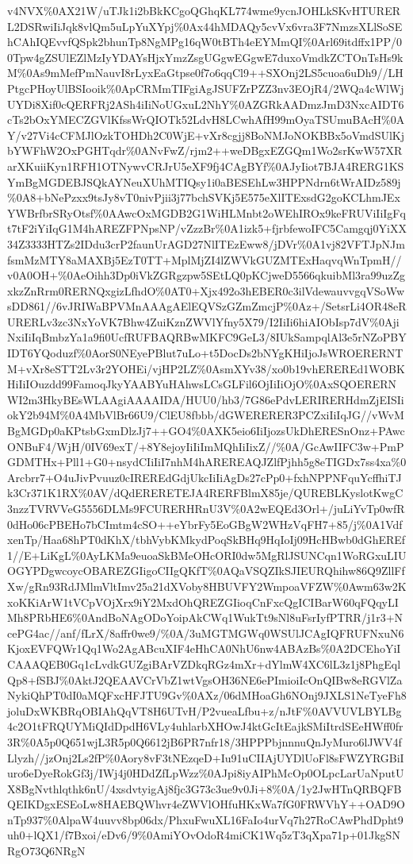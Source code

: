 \documentclass[]{article}
\begin{document}
v4NVX\%0AX21W/uTJk1i2bBkKCgoQGhqKL774wme9ycnJOHLkSKvHTURERL2DSRwiIiJqk8vlQm5uLpYuXYpj\%0Ax44hMDAQy5cvVx6vra3F7NmzsXLlSoSEhCAhIQEvvfQSpk2bhunTp8NgMPg16qW0tBTh4eEYMmQI\%0Arl69itdffx1PP/00Tpw4gZSUlEZlMzIyYDAYsHjxYmzZsgUGgwEGgwE7duxoVmdkZCTOnTsHs9kM\%0As9mMefPmNauvI8rLyxEaGtpse0f7o6qqCl9++SXOnj2LS5cuoa6uDh9//LHPtgcPHoyUlBSIooik\%0ApCRMmTIFgiAgJSUFZrPZZ3nv3EOjR4/2WQa4cWlWjUYDi8Xif0cQERFRj2ASh4iIiNoUGxuL2NhY\%0AZGRkAADmzJmD3NxcAIDT6cTs2bOxYMECZGVlKfssWrQIOTk52LdvH8LCwhAfH99mOyaTSUmuBAcH\%0AY/v27Vi4cCFMJlOzkTOHDh2C0WjE+vXr8cgjj8BoNMJoNOKBBx5oVmdSUlKjbYWFhW2OxPGHTqdr\%0ANvFwZ/rjm2++weDBgxEZGQm1Wo2srKwW57XRarXKuiiKyn1RFH1OTNywvCRJrU5eXF9fj4CAgBYf\%0AJyIiot7BJA4RERG1KSYmBgMGDEBJSQkAYNeuXUhMTIQsy1i0aBESEhLw3HPPNdrn6tWrAIDz589j\%0A8+bNePzxx9tsJy8vT0nivPjii3j77bchSVKj5E575eXlITExsdG2goKCLhmJExYWBrfbrSRyOtsf\%0AAwcOxMGDB2G1WiHLMnbt2oWEhIROx9keFRUViIiIgFqt7tF2iYiIqG1M4hAREZFPNpsNP/vZzzBr\%0A1izk5+fjrbfewoIFC5Camgqj0YiXX34Z3333HTZs2IDdu3crP2faunUrAGD27NlITEzEww8/jDVr\%0A1vj82VFTJpNJmfsmMzMTY8aMAXBj5EzT0TT+MplMjZI4lZWVkGUZMTExHaqvqWnTpmH//v0A0OH+\%0AeOihh3Dp0iVkZGRgzpw5SEtLQ0pKCjweD5566qkuibMl3ra99uzZgxkzZnRrm0RERNQxgizLfhdO\%0AT0+Xjx492o3hEBER0c3ilVdewauvvgqVSoWwsDD861//6vJRIWaBPVMnAAAgAElEQVSzGZmZmcjP\%0Az+/SetsrLi4OR48eRURERLv3zc3NxYoVK7Bhw4ZuiKznZWVlYfny5X79/I2IiIi6hiAIObIsp7dV\%0AjiNxiIiIqBmbzYa1a9fi0UcfRUFBAQRBwMKFC9GeL3/8IUkSampqlAl3e5rNZoPBYIDT6YQoduzf\%0AorS0NEyePBlut7uLo+t5DocDs2bNYgKHiIjoJsWROERERNTM+vXr8eSTT2Lv3r2YOHEi/vjHP2LZ\%0AsmXYv38/xo0b19vhEREREd1WOBKHiIiIOuzdd99FamoqJkyYAABYuHAhwsLCsGLFil6OjIiIiOjO\%0AxSQOERERNWI2m3HkyBEsWLAAgiAAAAIDA/HUU0/hb3/7G86ePdvLERIRERHdmZjEISIiokY2b94M\%0A4MbVlBr66U9/ClEU8fbbb/dGWERERER3PCZxiIiIqJG//vWvMBgMGDp0aKPtsbGxmDlzJj7++GO4\%0AXK5eio6IiIjozsUkDhERESnOnz+PAwcONBuF4/WjH/0IV69exT/+8Y8ejoyIiIiImMQhIiIixZ//\%0A/GcAwIIFC3w+PmPGDMTHx+Pll1+G0+nsydCIiIiI7nhM4hAREREAQJZlfPjhh5g8eTIGDx7ss4xa\%0Arcbrr7+O4uJivPvuuz0cIREREdGdjUkcIiIiAgDs27cPp0+fxhNPPNFquYcffhiTJk3Cr371K1RX\%0AV/dQdERERETEJA4RERFBlmX85je/QUREBLKyslotKwgC3nzzTVRVVeG5556DLMs9FCURERHRnU3V\%0A2wEQEd3Orl+/juLiYvTp0wfR0dHo06cPBEHo7bCImtm4cSO++eYbrFy5EoGBgW2WHzVqFH7+85/j\%0A1VdfxenTp/Haa68hPT0dKhX/tbhVybKMkydPoqSkBHq9HqIoIj09HcHBwb0dGhEREf1//E+LiKgL\%0AyLKMa9euoaSkBMeOHcORI0dw5MgRlJSUNCqn1WoRGxuLIUOGYPDgwcoycOBAREZGIigoCIIgQKfT\%0AQaVSQZIkSJIEURQhihw86Q9ZllFfXw/gRn93RdJMlmVltImv25a21dXVoby8HBUVFY2WmpoaVFZW\%0Awm63w2KxoKKiArW1tVCpVOjXrx9iY2MxdOhQREZGIioqCnFxcQgICIBarW60qFQqyLIMh8PRbHE6\%0AndBoNAgODoYoipAkCWq1WukTt9sNl8uFsrIyfPTRR/j1r3+NcePG4ac//anf/fLrX/8affr0we9/\%0A/3uMGTMGWq0WSUlJCAgIQFRUFNxuN6KjoxEVFQWr1Qq1Wo2AgABcuXIF4eHhCA0NhU6nw4ABAzBs\%0A2DCEhoYiICAAAQEB0Gq1cLvdkGUZgiBArVZDkqRGz4mXr+dYlmW4XC6lL3z1j8PhgEqlQp8+fSBJ\%0AktJ2QEAAVCrVbZ1wtVgsOH36NE6ePImioiIcOnQIBw8eRGVlZaNykiQhPT0dI0aMQFxcHFJTU9Gv\%0AXz/06dMHoaGh6NOnj9JXLS1NeTyeFh8joluDxWKBRqOBIAhQqVT8H6UTvH/P2vueaLfbu+z/nJtF\%0AVVUVLBYLBg4c2O1tFRQUYMiQIdDpdH6VLy4uhlarbXHOwJ4ktGcItEajkSMiItrdSEeHWff0fr3R\%0A5p0Q651wjL3R5p0Q6612jB6PR7nfr18/3HPPPbjnnnuQnJyMuro6lJWV4fLlyzh//jzOnj2Ls2fP\%0Aory8vF3tNEzqeD+Iu91uCIIAjUYDlUoFl8sFWZYRGBiIuro6eDyeRokGf3j/IWj4j0HDdZfLpWzz\%0AJpi8iyAIPhMcOp0OLpcLarUaNputUX8BgNvthlqthk6nU/4xsdvtyigAj8fjc3G73c3ue9v0Ji+8\%0A/1y2JwHTnQRBQFBQEIKDgxESEoLw8HAEBQWhvr4eZWVlOHfuHKxWa7fG0FRWVhY++OAD9OnTp937\%0AlpaW4uuvv8bp06dx/PhxuFwuXL16FaIo4urVq7h27RoCAwPhdDpht9uh0+lQX1/f7Bxoi/eDv6/9\%0AmiYOvOdoR4miCK1Wq5zT3qXpa71p+01JkgSNRgO73Q6NRgN
\end{document}
